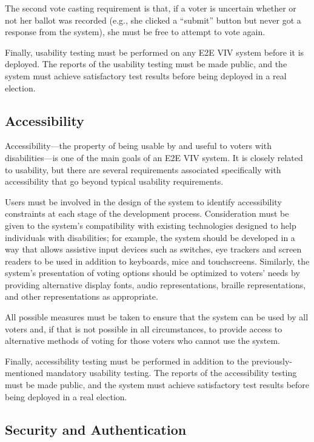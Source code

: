 The second vote casting requirement is that, if a voter is uncertain
whether or not her ballot was recorded (e.g., she clicked a ``submit''
button but never got a response from the system), she must be free
to attempt to vote again.

Finally, usability testing must be performed on any E2E VIV system
before it is deployed. The reports of the usability testing must be
made public, and the system must achieve satisfactory test results
before being deployed in a real election.


\subsection{Accessibility}

Accessibility---the property of being usable by and useful to voters with disabilities---is one of the main goals of an E2E VIV system. It is
closely related to usability, but there are several requirements
associated specifically with accessibility that go beyond typical
usability requirements. 

Users must be involved in the design of the system to identify
accessibility constraints at each stage of the development
process. Consideration must be given to the system's compatibility
with existing technologies designed to help individuals with disabilities; for
example, the system should be developed in a way that allows assistive
input devices such as switches, eye trackers and screen readers to be
used in addition to keyboards, mice and touchscreens. Similarly, the
system's presentation of voting options should be optimized to voters'
needs by providing alternative display fonts, audio representations,
braille representations, and other representations as appropriate.

All possible measures must be taken to ensure that the system can be
used by all voters and, if that is not possible in all circumstances,
to provide access to alternative methods of voting for those voters
who cannot use the system.

Finally, accessibility testing must be performed in addition to the
previously-mentioned mandatory usability testing. The reports of the
accessibility testing must be made public, and the system must achieve
satisfactory test results before being deployed in a real election.

\subsection{Security and Authentication}

